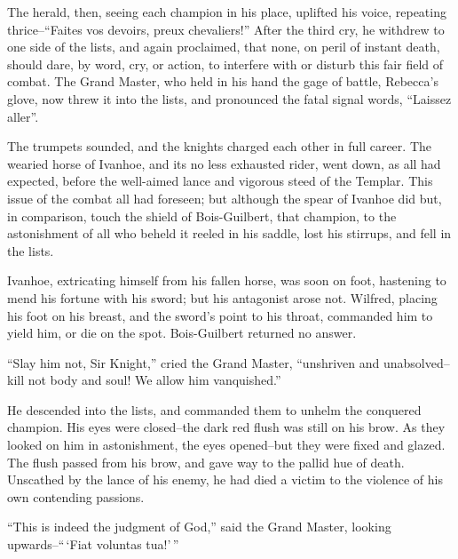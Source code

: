 The herald, then, seeing each champion in his place, uplifted his voice,
repeating thrice--``Faites vos devoirs, preux chevaliers!'' After the
third cry, he withdrew to one side of the lists, and again proclaimed,
that none, on peril of instant death, should dare, by word, cry, or
action, to interfere with or disturb this fair field of combat. The
Grand Master, who held in his hand the gage of battle, Rebecca's glove,
now threw it into the lists, and pronounced the fatal signal words,
``Laissez aller''.

The trumpets sounded, and the knights charged each other in full career.
The wearied horse of Ivanhoe, and its no less exhausted rider, went
down, as all had expected, before the well-aimed lance and vigorous
steed of the Templar. This issue of the combat all had foreseen; but
although the spear of Ivanhoe did but, in comparison, touch the shield
of Bois-Guilbert, that champion, to the astonishment of all who beheld
it reeled in his saddle, lost his stirrups, and fell in the lists.

Ivanhoe, extricating himself from his fallen horse, was soon on foot,
hastening to mend his fortune with his sword; but his antagonist arose
not. Wilfred, placing his foot on his breast, and the sword's point to
his throat, commanded him to yield him, or die on the spot.
Bois-Guilbert returned no answer.

``Slay him not, Sir Knight,'' cried the Grand Master, ``unshriven and
unabsolved--kill not body and soul! We allow him vanquished.''

He descended into the lists, and commanded them to unhelm the conquered
champion. His eyes were closed--the dark red flush was still on his
brow. As they looked on him in astonishment, the eyes opened--but they
were fixed and glazed. The flush passed from his brow, and gave way to
the pallid hue of death. Unscathed by the lance of his enemy, he had
died a victim to the violence of his own contending passions.

``This is indeed the judgment of God,'' said the Grand Master, looking
upwards--``\,`Fiat voluntas tua!'\,''
